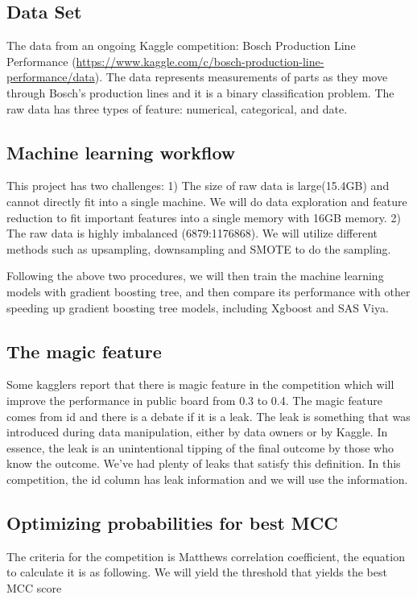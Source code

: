\documentclass{article}
\begin{document}
\subsection{Data Set}

The data from an ongoing Kaggle competition: Bosch Production Line Performance (\url{https://www.kaggle.com/c/bosch-production-line-performance/data}). The data represents measurements of parts as they move through Bosch's production lines and it is a binary classification problem. The raw data has three types of feature: numerical, categorical, and date.

\subsection{Machine learning workflow}

This project has two challenges: 1) The size of raw data is large(15.4GB) and cannot directly fit into a single machine. We will do data exploration and feature reduction to fit important features into a single memory with 16GB memory. 2) The raw data is highly imbalanced (6879:1176868). We will utilize different methods such as upsampling, downsampling and SMOTE to do the sampling.

Following the above two procedures, we will then train the machine learning models with gradient boosting tree, and then compare its performance with other speeding up gradient boosting tree models, including Xgboost and SAS Viya.

\subsection{The magic feature}
Some kagglers report that there is magic feature in the competition which will improve the performance in public board from 0.3 to 0.4. The magic feature comes from id and there is a debate if it is a leak. The leak is something that was introduced during data manipulation, either by data owners or by Kaggle. In essence, the leak is an unintentional tipping of the final outcome by those who know the outcome. We've had plenty of leaks that satisfy this definition.  In this competition, the id column has leak information and we will use the information.

\subsection{Optimizing probabilities for best MCC}
The criteria for the competition is Matthews correlation coefficient, the equation to calculate it is as following. We will yield the threshold that yields the best MCC score
\end{document}
